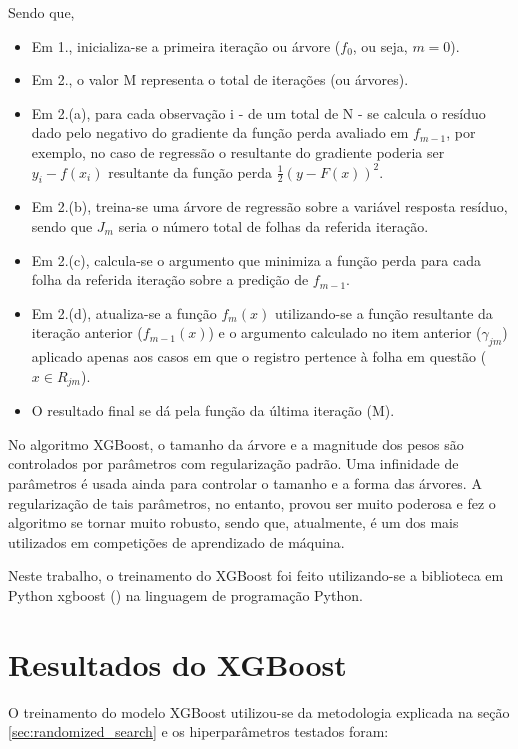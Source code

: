 Sendo que,

\begin{itemize}
	\item Em 1., inicializa-se a primeira iteração ou árvore ($ f_0 $, ou seja, $ m=0 $).
	\item Em 2., o valor M representa o total de iterações (ou árvores).
	\item Em 2.(a), para cada observação i - de um total de N - se calcula o resíduo dado pelo negativo do gradiente da função perda avaliado em $ f_{m-1} $, por exemplo, no caso de regressão o resultante do gradiente poderia ser $ y_i - f(x_i) $ resultante da função perda $ \frac{1}{2} (y - F(x))^{2} $.
	\item Em 2.(b), treina-se uma árvore de regressão sobre a variável resposta resíduo, sendo que $ J_m $ seria o número total de folhas da referida iteração.
	\item Em 2.(c), calcula-se o argumento que minimiza a função perda para cada folha da referida iteração sobre a predição de $ f_{m-1} $.
	\item Em 2.(d), atualiza-se a função $ f_m(x) $ utilizando-se a função resultante da iteração anterior ($ f_{m-1}(x) $) e o argumento calculado no item anterior ($ \gamma_{jm} $) aplicado apenas aos casos em que o registro pertence à folha em questão ($ x \in R_{jm} $).
	\item O resultado final se dá pela função da última iteração (M).
\end{itemize}

No algoritmo XGBoost, o tamanho da árvore e a magnitude dos pesos são controlados por parâmetros com regularização padrão. Uma infinidade de parâmetros é usada ainda para controlar o tamanho e a forma das árvores. A regularização de tais parâmetros, no entanto, provou ser muito poderosa e fez o algoritmo se tornar muito robusto, sendo que, atualmente, é um dos mais utilizados em competições de aprendizado de máquina.

Neste trabalho, o treinamento do XGBoost foi feito utilizando-se a biblioteca em Python xgboost (\citet{Xgboost}) na linguagem de programação Python.

\section{Resultados do XGBoost}
\label{sec:resultados_xgboost}

O treinamento do modelo XGBoost utilizou-se da metodologia explicada na seção \ref{sec:randomized_search} e os hiperparâmetros testados foram:

